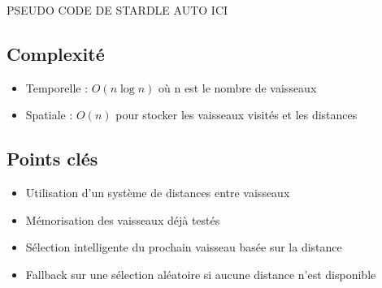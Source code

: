 \documentclass{article}
\begin{document}
PSEUDO CODE DE STARDLE AUTO ICI


\subsection{Complexité}
\begin{itemize}
    \item Temporelle : $O(n \log n)$ où n est le nombre de vaisseaux
    \item Spatiale : $O(n)$ pour stocker les vaisseaux visités et les distances
\end{itemize}

\subsection{Points clés}
\begin{itemize}
    \item Utilisation d'un système de distances entre vaisseaux
    \item Mémorisation des vaisseaux déjà testés
    \item Sélection intelligente du prochain vaisseau basée sur la distance
    \item Fallback sur une sélection aléatoire si aucune distance n'est disponible
\end{itemize}
\end{document}
